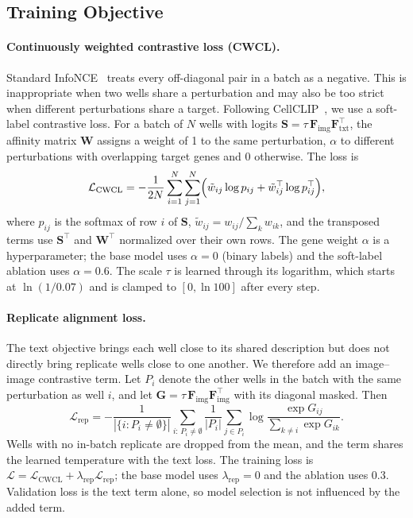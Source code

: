 \subsection{Training Objective}

\paragraph{Continuously weighted contrastive loss (CWCL).}
Standard InfoNCE~\cite{oord2018infonce} treats every off-diagonal pair in a batch as a negative.
This is inappropriate when two wells share a perturbation and may also be too strict when different
perturbations share a target. Following CellCLIP~\cite{lu2025cellclip}, we use a soft-label
contrastive loss. For a batch of $N$ wells with logits
$\mathbf{S} = \tau\, \mathbf{F}_{\text{img}} \mathbf{F}_{\text{txt}}^{\top}$, the affinity matrix
$\mathbf{W}$ assigns a weight of 1 to the same perturbation, $\alpha$ to different perturbations
with overlapping target genes and 0 otherwise.
The loss is
\begin{equation}
  \mathcal{L}_{\text{CWCL}}
  = -\frac{1}{2N}
  \sum_{i=1}^{N}
  \sum_{j=1}^{N}
  \Bigl(
  \tilde{w}_{ij} \log p_{ij}
  + \tilde{w}^{\top}_{ij} \log p^{\top}_{ij}
  \Bigr),
\end{equation}
where $p_{ij}$ is the softmax of row $i$ of $\mathbf{S}$,
$\tilde{w}_{ij} = w_{ij} / \sum_k w_{ik}$, and the transposed terms use $\mathbf{S}^{\top}$ and
$\mathbf{W}^{\top}$ normalized over their own rows. The gene weight $\alpha$ is a hyperparameter;
the base model uses $\alpha = 0$ (binary labels) and the soft-label ablation uses $\alpha = 0.6$.
The scale $\tau$ is learned through its logarithm, which starts at $\ln(1/0.07)$ and is clamped to
$[0, \ln 100]$ after every step.

\paragraph{Replicate alignment loss.}
The text objective brings each well close to its shared description but does not directly bring
replicate wells close to one another. We therefore add an image--image contrastive term. Let $P_i$
denote the other wells in the batch with the same perturbation as well $i$, and let $\mathbf{G} =
  \tau\, \mathbf{F}_{\text{img}} \mathbf{F}_{\text{img}}^{\top}$ with its diagonal masked. Then
\begin{equation}
  \mathcal{L}_{\text{rep}}
  = -\frac{1}{|\{i : P_i \neq \emptyset\}|}
  \sum_{i:\, P_i \neq \emptyset}
  \frac{1}{|P_i|}
  \sum_{j \in P_i}
  \log \frac{\exp G_{ij}}{\sum_{k \neq i} \exp G_{ik}} .
\end{equation}
Wells with no in-batch replicate are dropped from the mean, and the term shares the learned
temperature with the text loss. The training loss is
$\mathcal{L} = \mathcal{L}_{\text{CWCL}} + \lambda_{\text{rep}} \mathcal{L}_{\text{rep}}$; the base
model uses $\lambda_{\text{rep}} = 0$ and the ablation uses $0.3$. Validation loss is the text term
alone, so model selection is not influenced by the added term.

